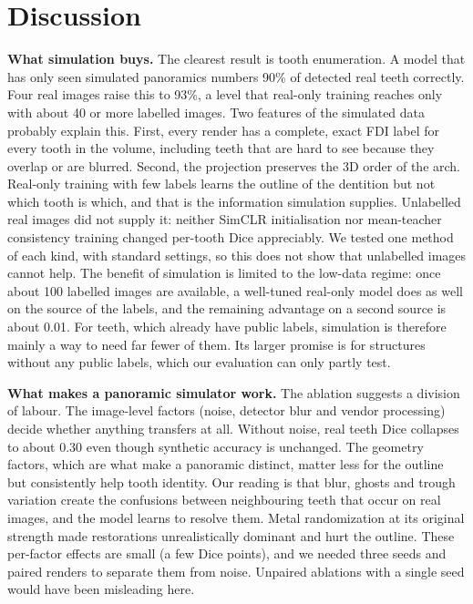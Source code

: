 \documentclass[preprint,12pt]{elsarticle}
\begin{document}
\section{Discussion}

\textbf{What simulation buys.} The clearest result is tooth enumeration. A model that has only seen simulated panoramics
numbers 90\% of detected real teeth correctly. Four real images raise this to 93\%, a level that real-only training
reaches only with about 40 or more labelled images. Two features of the simulated data probably explain this. First,
every render has a complete, exact FDI label for every tooth in the volume, including teeth that are hard to see because
they overlap or are blurred. Second, the projection preserves the 3D order of the arch. Real-only training with few
labels learns the outline of the dentition but not which tooth is which, and that is the information simulation
supplies. Unlabelled real images did not supply it: neither SimCLR initialisation nor mean-teacher consistency training
changed per-tooth Dice appreciably. We tested one method of each kind, with standard settings, so this does not show
that unlabelled images cannot help. The benefit of simulation is limited to the low-data regime: once
about 100 labelled images are available, a well-tuned real-only model does as well on the source of the labels, and
the remaining advantage on a second source is about 0.01. For teeth, which already have public labels, simulation is therefore mainly a way to need far fewer of them. Its larger promise is for structures without any public labels, which our evaluation can only partly
test.

\textbf{What makes a panoramic simulator work.} The ablation suggests a division of labour. The image-level factors
(noise, detector blur and vendor processing) decide whether anything transfers at all. Without noise, real teeth Dice
collapses to about 0.30 even though synthetic accuracy is unchanged. The geometry factors, which are what make a
panoramic distinct, matter less for the outline but consistently help tooth identity. Our reading is that blur, ghosts
and trough variation create the confusions between neighbouring teeth that occur on real images, and the model learns to
resolve them. Metal randomization at its original strength made restorations unrealistically dominant and hurt the
outline. These per-factor effects are small (a few Dice points), and we needed three seeds and paired renders to separate
them from noise. Unpaired ablations with a single seed would have been misleading here.
\end{document}
